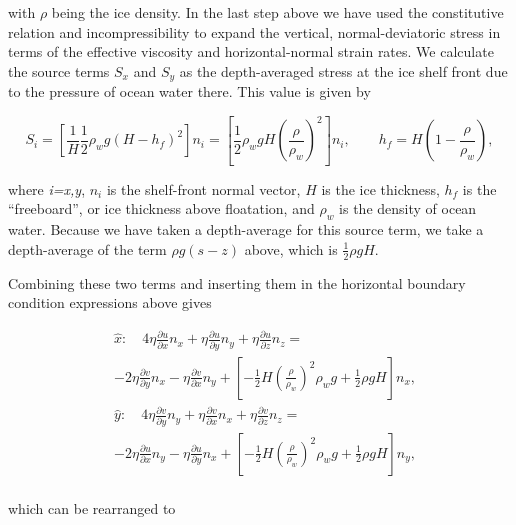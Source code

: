 with \textit{\(\rho{}\)} being the ice density. In the last step above we have used the constitutive relation and incompressibility to expand the vertical, normal-deviatoric stress in terms of the effective viscosity and horizontal-normal strain rates. We calculate the source terms $S_x$ and $S_y$ as the depth-averaged stress at the ice shelf front due to the pressure of ocean water there. This value is given by

\begin{equation}
S_{i}=\left[ \frac{1}{H}\frac{1}{2}\rho _{w}g\left( H-h_f \right)^{2} \right]n_{i}=\left[ \frac{1}{2}\rho _{w}gH\left( \frac{\rho }{\rho _{w}} \right)^{2} \right]n_{i},\quad \quad h_f=H\left( 1-\frac{\rho _{{}}}{\rho _{w}} \right),
\end{equation}

where  \textit{i=x,y}, $n_i$ is the shelf-front normal vector, $H$ is the ice thickness, $h_f$ is the ``freeboard'', or ice thickness above floatation, and $\rho_w$ is the density of ocean water. Because we have taken a depth-average for this source term, we take a depth-average of the term $\rho g\left( s-z \right)$ above, which is $\frac{1}{2}\rho gH$.

Combining these two terms and inserting them in the horizontal boundary condition expressions above gives

\begin{equation}
\begin{split}
& \hat{x}:\quad 4\eta \frac{\partial u}{\partial x}n_{x}+\eta \frac{\partial u}{\partial y}n_{y}+\eta \frac{\partial u}{\partial z}n_{z}= \\
& -2\eta \frac{\partial v}{\partial y}n_{x}-\eta \frac{\partial v}{\partial x}n_{y}+\left[ -\frac{1}{2}H\left( \frac{\rho }{\rho _{w}} \right)^{2}\rho _{w}g+\frac{1}{2}\rho gH \right]n_{x}, \\ 
 & \hat{y}:\quad 4\eta \frac{\partial v}{\partial y}n_{y}+\eta \frac{\partial v}{\partial x}n_{x}+\eta \frac{\partial v}{\partial z}n_{z}= \\
 & -2\eta \frac{\partial u}{\partial x}n_{y}-\eta \frac{\partial u}{\partial y}n_{x}+\left[ -\frac{1}{2}H\left( \frac{\rho }{\rho _{w}} \right)^{2}\rho _{w}g+\frac{1}{2}\rho gH \right]n_{y}, \\ 
\end{split}
\end{equation}

which can be rearranged to

